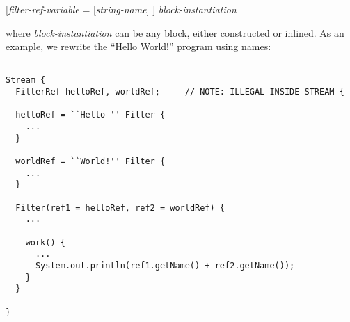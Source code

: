 [{\it filter-ref-variable} = [{\it string-name}] ] {\it block-instantiation}

where {\it block-instantiation} can be any block, either constructed
or inlined.  As an example, we rewrite the ``Hello World!'' program
using names:

\begin{verbatim} 

Stream {
  FilterRef helloRef, worldRef;		// NOTE: ILLEGAL INSIDE STREAM {

  helloRef = ``Hello '' Filter {
	...
  }

  worldRef = ``World!'' Filter {
	...
  }

  Filter(ref1 = helloRef, ref2 = worldRef) {
    ...
    
    work() {
      ...
      System.out.println(ref1.getName() + ref2.getName());
    }
  }

}

\end{verbatim}



